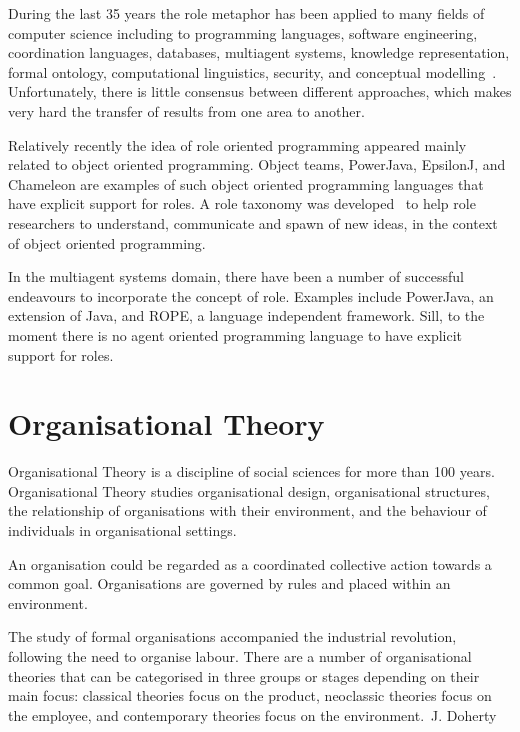 \documentclass[a4paper,12pt,oneside,fleqn]{book} %
\begin{document}
During the last 35 years the role metaphor has been applied to many fields
of computer science including to programming languages, software
engineering, coordination languages, databases, multiagent systems,
knowledge representation, formal ontology, computational linguistics,
security, and conceptual modelling~\cite{DBLP:journals/ao/BoellaTV07}.
Unfortunately, there is little consensus between different approaches,
which makes very hard the transfer of results from one area to another.

Relatively recently the idea of role oriented programming appeared mainly
related to object oriented programming. Object teams, PowerJava, EpsilonJ,
and Chameleon are examples of such object oriented programming languages
that have explicit support for roles. A role taxonomy was
developed~\cite{graversen06nature} to help role researchers to understand,
communicate and spawn of new ideas, in the context of object oriented
programming.

In the multiagent systems domain, there have been a number of successful
endeavours to incorporate the concept of role. Examples include PowerJava,
an extension of Java, and ROPE, a language independent framework. Sill, to
the moment there is no agent oriented programming language to have explicit
support for roles.


\section{Organisational Theory}  %

Organisational Theory is a discipline of social sciences for more than 100
years. Organisational Theory studies organisational design, organisational
structures, the relationship of organisations with their environment, and
the behaviour of individuals in organisational settings.

An organisation could be regarded as a coordinated collective action
towards a common goal. Organisations are governed by rules and placed
within an environment.

The study of formal organisations accompanied the industrial
revolution, following the need to organise labour. There are a number of
organisational theories that can be categorised in three groups or stages
depending on their main focus: classical theories focus on the product,
neoclassic theories focus on the employee, and contemporary theories focus
on the environment.~\cite{}J. Doherty
\end{document}
